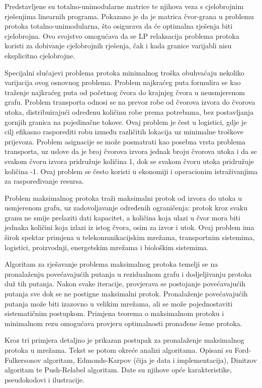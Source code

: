 \documentclass[11pt, a4paper]{article}
\begin{document}
	Predstavljene su totalno-unimodularne matrice te njihova veza s cjelobrojnim rješenjima linearnih programa. Pokazano je da je matrica čvor-grana u problemu protoka totalno-unimodularna, što osigurava da će optimalna rješenja biti cjelobrojna. Ovo svojstvo omogućava da se LP relaksacija problema protoka koristi za dobivanje cjelobrojnih rješenja, čak i kada granice varijabli nisu eksplicitno cjelobrojne.
	
	Specijalni slučajevi problema protoka minimalnog troška obuhvaćaju nekoliko varijacija ovog osnovnog problema. Problem najkraćeg puta formulira se kao traženje najkraćeg puta od početnog čvora do krajnjeg čvora u neusmjerenom grafu. Problem transporta odnosi se na prevoz robe od čvorova izvora do čvorova utoka, distribuirajući određenu količinu robe prema potrebama, bez postavljanja gornjih granica na pojedinačne tokove. Ovaj problem je čest u logistici, gdje je cilj efikasno rasporediti robu između različitih lokacija uz minimalne troškove prijevoza. Problem asignacije se može posmatrati kao posebna vrsta problema transporta, uz uslove da je broj čvorova izvora jednak broju čvorova utoka i da se svakom čvoru izvora pridružuje količina 1, dok se svakom čvoru utoka pridružuje količina -1. Ovaj problem se često koristi u ekonomiji i operacionim istraživanjima za raspoređivanje resursa.
	
	Problem maksimalnog protoka traži maksimalni protok od izvora do utoka u usmjerenom grafu, uz zadovoljavanje određenih ograničenja: protok kroz svaku granu ne smije prelaziti dati kapacitet, a količina koja ulazi u čvor mora biti jednaka količini koja izlazi iz istog čvora, osim za izvor i utok. Ovaj problem ima širok spektar primjena u telekomunikacijskim mrežama, transportnim sistemima, logistici, proizvodnji, energetskim mrežama i biološkim sistemima.
	
	Algoritam za rješavanje problema maksimalnog protoka temelji se na pronalaženju povećavajućih putanja u rezidualnom grafu i dodjeljivanju protoka duž tih putanja. Nakon svake iteracije, provjerava se postojanje povećavajućih putanja sve dok se ne postigne maksimalni protok. Pronalaženje povećavajućih putanja može biti izazovno u velikim mrežama, ali se može pojednostaviti sistematičnim postupkom. Primjena teorema o maksimalnom protoku i minimalnom rezu omogućava provjeru optimalnosti pronađene šeme protoka.
	
	Kroz tri primjera detaljno je prikazan postupak za pronalaženje maksimalnog protoka u mrežama. Tekst se potom okreće analizi algoritama. Opisani su Ford-Fulkersonov algoritam, Edmonds-Karpov (čija je data i implementacija), Dinitzov algoritam te Push-Relabel algoritam. Date su njihove opće karakteristike, pseudokodovi i ilustracije.
	
\end{document}
